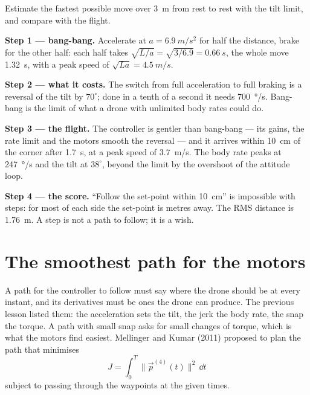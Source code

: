 \begin{example}
\label{ex:minsnap-step}
Estimate the fastest possible move over \SI{3}{m} from rest to rest with the tilt limit, and compare with the flight.

\textbf{Step 1 — bang-bang.} Accelerate at $a = \SI{6.9}{m/s^2}$ for half the distance, brake for the other half: each half takes $\sqrt{L/a} = \sqrt{3/6.9} = \SI{0.66}{s}$, the whole move \SI{1.32}{s}, with a peak speed of $\sqrt{La} = \SI{4.5}{m/s}$.

\textbf{Step 2 — what it costs.} The switch from full acceleration to full braking is a reversal of the tilt by $70^\circ$; done in a tenth of a second it needs \SI{700}{\degree/s}. Bang-bang is the limit of what a drone with unlimited body rates could do.

\textbf{Step 3 — the flight.} The controller is gentler than bang-bang — its gains, the rate limit and the motors smooth the reversal — and it arrives within \SI{10}{cm} of the corner after \SI{1.7}{s}, at a peak speed of \SI{3.7}{m/s}. The body rate peaks at \SI{247}{\degree/s} and the tilt at $38^\circ$, beyond the limit by the overshoot of the attitude loop.

\textbf{Step 4 — the score.} \enquote{Follow the set-point within \SI{10}{cm}} is impossible with steps: for most of each side the set-point is metres away. The RMS distance is \SI{1.76}{m}. A step is not a path to follow; it is a wish.
\end{example}

\section{The smoothest path for the motors}

A path for the controller to follow must say where the drone should be at every instant, and its derivatives must be ones the drone can produce. The previous lesson listed them: the acceleration sets the tilt, the jerk the body rate, the snap the torque. A path with small snap asks for small changes of torque, which is what the motors find easiest. Mellinger and Kumar (2011) proposed to plan the path that minimises
\begin{equation}\label{eq:minsnap-cost}
  J = \int_0^T \big\|\vec p^{(4)}(t)\big\|^2\,\dd t
\end{equation}
subject to passing through the waypoints at the given times.

